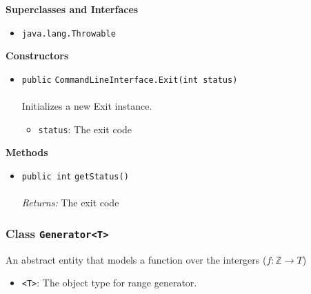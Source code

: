 \textbf{\sffamily Superclasses and Interfaces}
\begin{itemize}
\item \lstinline|java.lang.Throwable|
\end{itemize}


\textbf{\sffamily Constructors}
\begin{itemize}
\item \lstinline|public| \lstinline|CommandLineInterface.Exit|\lstinline|(int status)|\\ \\[-0.6em]
Initializes a new Exit instance.
\begin{itemize}
\item \lstinline|status|: The exit code
\end{itemize}



\end{itemize}


\textbf{\sffamily Methods}
\begin{itemize}
\item \lstinline|public int| \lstinline|getStatus|\lstinline|()|\\ \\[-0.6em]
\emph{Returns:} The exit code



\end{itemize}

\subsubsection{Class \lstinline|Generator<T>|}
An abstract entity that models a function over the intergers ($f: \mathbb{Z}
 \to T$) \\
\noindent\begin{minipage}[t]{5cm}
\vspace{0.3em}
\hspace*{2em}
\vspace{0.3em}
\end{minipage}

\begin{itemize}
\item \lstinline|<T>|: The object type for range generator.
\end{itemize}




